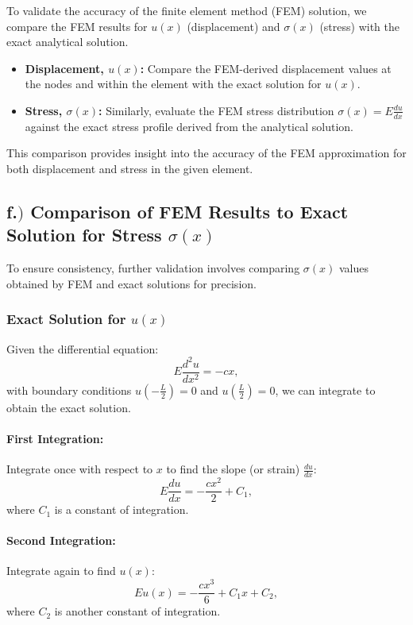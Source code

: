 To validate the accuracy of the finite element method (FEM) solution, we compare the FEM results for \( u(x) \) (displacement) and \( \sigma(x) \) (stress) with the exact analytical solution.

\begin{itemize}
    \item \textbf{Displacement, \( u(x) \):} Compare the FEM-derived displacement values at the nodes and within the element with the exact solution for \( u(x) \).
    \item \textbf{Stress, \( \sigma(x) \):} Similarly, evaluate the FEM stress distribution \( \sigma(x) = E \frac{du}{dx} \) against the exact stress profile derived from the analytical solution.
\end{itemize}

This comparison provides insight into the accuracy of the FEM approximation for both displacement and stress in the given element.

\subsection*{f.$)$ Comparison of FEM Results to Exact Solution for Stress \( \sigma(x) \)}

To ensure consistency, further validation involves comparing \( \sigma(x) \) values obtained by FEM and exact solutions for precision.

\subsubsection*{Exact Solution for \( u(x) \)}

Given the differential equation:
\[
E \frac{d^2 u}{dx^2} = -c x,
\]
with boundary conditions \( u\left(-\frac{L}{2}\right) = 0 \) and \( u\left(\frac{L}{2}\right) = 0 \), we can integrate to obtain the exact solution.

\paragraph{First Integration:} Integrate once with respect to \( x \) to find the slope (or strain) \( \frac{du}{dx} \):
\[
E \frac{du}{dx} = -\frac{c x^2}{2} + C_1,
\]
where \( C_1 \) is a constant of integration.

\paragraph{Second Integration:} Integrate again to find \( u(x) \):
\[
E u(x) = -\frac{c x^3}{6} + C_1 x + C_2,
\]
where \( C_2 \) is another constant of integration.

